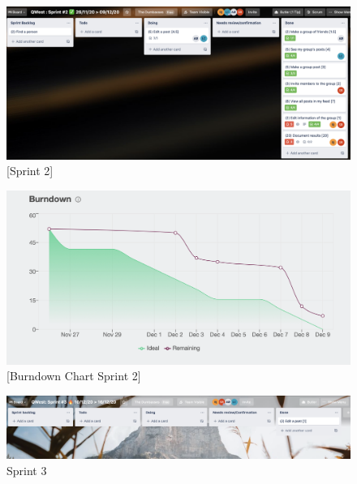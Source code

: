 \begin{figure}
    \includegraphics[width=\linewidth]{figures/Sprint 2.png}
    \caption{[Sprint 2]}
    \label{fig:[Sp2]}
\end{figure}



\begin{figure}
    \includegraphics[width=\linewidth]{figures/Sprint 2 Burndown.png}
    \caption{[Burndown Chart Sprint 2]}
    \label{fig:[Bc2]}
\end{figure}

\begin{figure}
    \includegraphics[width=\linewidth]{figures/Sprint 3 .png}
    \caption{{Sprint 3}}
    \label{fig:[Sp3]}
\end{figure}




